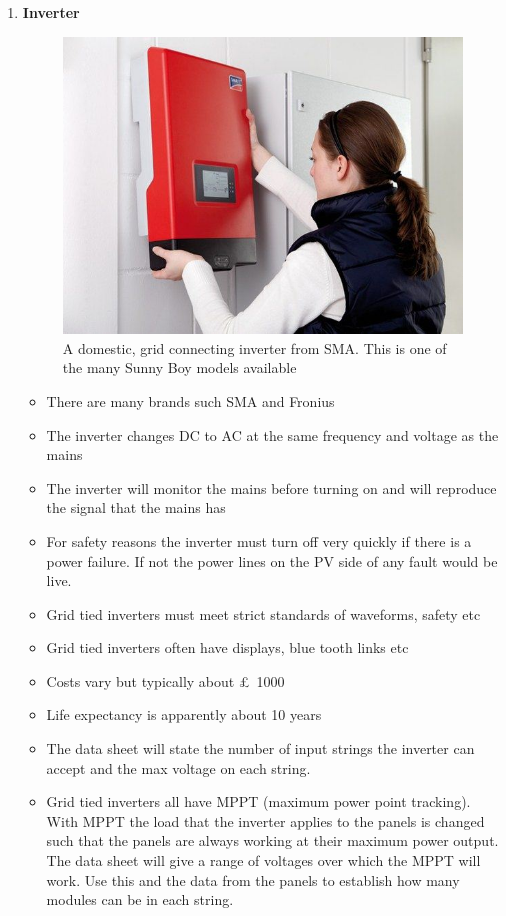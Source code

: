\documentclass{article}
\begin{document}
\begin{enumerate}
\begin{itemize}
\end{itemize}
\item \textbf{Inverter}
\begin{figure}[h]
\centering
\includegraphics[width=0.5\linewidth]{../figures/SMA-Sunny-Boy.jpg}
\caption{A domestic, grid connecting inverter from SMA. This is one of the many Sunny Boy models available}
\label{fig:SMA-inverter}
\end{figure}
\begin{itemize}
\item There are many brands such SMA and Fronius 
\item	The inverter changes DC to AC at the same frequency and voltage as the mains
\item	The inverter will monitor the mains before turning on and will reproduce the signal that the mains has
\item	For safety reasons the inverter must turn off very quickly if there is a power failure. If not the power lines on the PV side of any fault would be live.
\item	Grid tied inverters must meet strict standards of waveforms, safety etc
\item	Grid tied inverters often have displays, blue tooth links etc
\item	Costs vary but typically about \SI{1000}[\pounds]{}
\item	Life expectancy is apparently about 10 years
\item	The data sheet will state the number of input strings the inverter can accept and the max voltage on each string. 
\item	Grid tied inverters all have MPPT (maximum power point tracking). With MPPT the load that the inverter applies to the panels is changed such that the panels are always working at their maximum power output. The data sheet will give a range of voltages over which the MPPT will work. Use this and the data from the panels to establish how many modules can be in each string.

\end{itemize}
\end{enumerate}
\end{document}
